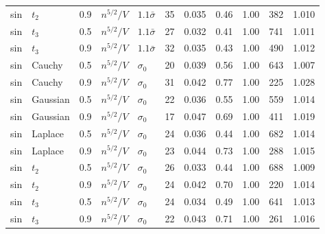 \begin{longtable}{lllllcccccc}
sin & $t_2$ & 0.9 & $n^{5/2}/V$ & $1.1\bar\sigma$ & 35 & 0.035 & 0.46 & 1.00 & 382 & 1.010 \\
sin & $t_3$ & 0.5 & $n^{5/2}/V$ & $1.1\bar\sigma$ & 27 & 0.032 & 0.41 & 1.00 & 741 & 1.011 \\
sin & $t_3$ & 0.9 & $n^{5/2}/V$ & $1.1\bar\sigma$ & 32 & 0.035 & 0.43 & 1.00 & 490 & 1.012 \\
sin & Cauchy & 0.5 & $n^{5/2}/V$ & $\sigma_0$ & 20 & 0.039 & 0.56 & 1.00 & 643 & 1.007 \\
sin & Cauchy & 0.9 & $n^{5/2}/V$ & $\sigma_0$ & 31 & 0.042 & 0.77 & 1.00 & 225 & 1.028 \\
sin & Gaussian & 0.5 & $n^{5/2}/V$ & $\sigma_0$ & 22 & 0.036 & 0.55 & 1.00 & 559 & 1.014 \\
sin & Gaussian & 0.9 & $n^{5/2}/V$ & $\sigma_0$ & 17 & 0.047 & 0.69 & 1.00 & 411 & 1.019 \\
sin & Laplace & 0.5 & $n^{5/2}/V$ & $\sigma_0$ & 24 & 0.036 & 0.44 & 1.00 & 682 & 1.014 \\
sin & Laplace & 0.9 & $n^{5/2}/V$ & $\sigma_0$ & 23 & 0.044 & 0.73 & 1.00 & 288 & 1.015 \\
sin & $t_2$ & 0.5 & $n^{5/2}/V$ & $\sigma_0$ & 26 & 0.033 & 0.44 & 1.00 & 688 & 1.009 \\
sin & $t_2$ & 0.9 & $n^{5/2}/V$ & $\sigma_0$ & 24 & 0.042 & 0.70 & 1.00 & 220 & 1.014 \\
sin & $t_3$ & 0.5 & $n^{5/2}/V$ & $\sigma_0$ & 24 & 0.034 & 0.49 & 1.00 & 641 & 1.013 \\
sin & $t_3$ & 0.9 & $n^{5/2}/V$ & $\sigma_0$ & 22 & 0.043 & 0.71 & 1.00 & 261 & 1.016 \\
\bottomrule
\end{longtable}
